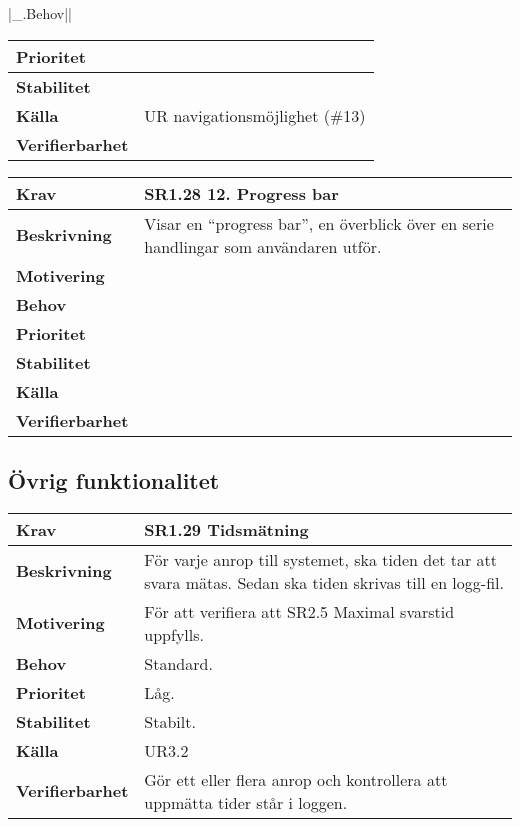 \documentclass[a4paper, twoside, 11pt, titlepage]{article}
\begin{document}
	|\_.Behov|| 

	\begin{tabular} { p{2.6cm} p{12.5cm} }
		\hline
		\sffamily\textbf{Prioritet} &   \\
		\hline
		\sffamily\textbf{Stabilitet} &   \\
		\hline
		\sffamily\textbf{Källa} & UR navigationsmöjlighet (\#13)  \\
		\hline
		\sffamily\textbf{Verifierbarhet} &   \\
		\hline
	\end{tabular}
	\vspace{6mm}

	\begin{tabular} { p{2.6cm} p{12.5cm} }
		\hline
		\sffamily\textbf{Krav} & \sffamily\textbf{SR1.28 12. Progress bar } \\
		\hline
		\sffamily\textbf{Beskrivning} & Visar en ``progress bar'', en överblick över en serie handlingar som användaren utför.  \\
		\hline
		\sffamily\textbf{Motivering} &   \\
		\hline
		\sffamily\textbf{Behov} &   \\
		\hline
		\sffamily\textbf{Prioritet} &   \\
		\hline
		\sffamily\textbf{Stabilitet} &   \\
		\hline
		\sffamily\textbf{Källa} &   \\
		\hline
		\sffamily\textbf{Verifierbarhet} &   \\
		\hline
	\end{tabular}


	\subsection{Övrig  funktionalitet}


	\begin{tabular} { p{2.6cm} p{12.5cm} }
		\hline
		\sffamily\textbf{Krav} & \sffamily\textbf{SR1.29 Tidsmätning } \\
		\hline
		\sffamily\textbf{Beskrivning} & För varje anrop till systemet, ska tiden det tar att svara mätas. Sedan ska tiden skrivas till en logg-fil.  \\
		\hline
		\sffamily\textbf{Motivering} & För att verifiera att SR2.5 Maximal svarstid uppfylls.  \\
		\hline
		\sffamily\textbf{Behov} & Standard.  \\
		\hline
		\sffamily\textbf{Prioritet} & Låg.  \\
		\hline
		\sffamily\textbf{Stabilitet} & Stabilt.  \\
		\hline
		\sffamily\textbf{Källa} & UR3.2  \\
		\hline
		\sffamily\textbf{Verifierbarhet} & Gör ett eller flera anrop och kontrollera att uppmätta tider står i loggen.  \\
		\hline
	\end{tabular}
\end{document}
